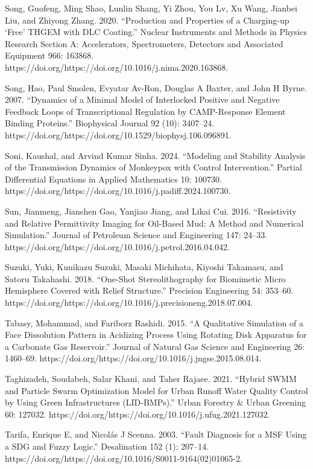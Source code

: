 \documentclass[utf8]{gradu3}
\begin{document}
Song, Guofeng, Ming Shao, Lunlin Shang, Yi Zhou, You Lv, Xu Wang, Jianbei Liu, and Zhiyong Zhang. 2020. “Production and Properties of a Charging-up ‘Free’ THGEM with DLC Coating.” Nuclear Instruments and Methods in Physics Research Section A: Accelerators, Spectrometers, Detectors and Associated Equipment 966: 163868. https://doi.org/https://doi.org/10.1016/j.nima.2020.163868.

Song, Hao, Paul Smolen, Evyatar Av-Ron, Douglas A Baxter, and John H Byrne. 2007. “Dynamics of a Minimal Model of Interlocked Positive and Negative Feedback Loops of Transcriptional Regulation by CAMP-Response Element Binding Proteins.” Biophysical Journal 92 (10): 3407–24. https://doi.org/https://doi.org/10.1529/biophysj.106.096891.

Soni, Kaushal, and Arvind Kumar Sinha. 2024. “Modeling and Stability Analysis of the Transmission Dynamics of Monkeypox with Control Intervention.” Partial Differential Equations in Applied Mathematics 10: 100730. https://doi.org/https://doi.org/10.1016/j.padiff.2024.100730.

Sun, Jianmeng, Jianshen Gao, Yanjiao Jiang, and Likai Cui. 2016. “Resistivity and Relative Permittivity Imaging for Oil-Based Mud: A Method and Numerical Simulation.” Journal of Petroleum Science and Engineering 147: 24–33. https://doi.org/https://doi.org/10.1016/j.petrol.2016.04.042.

Suzuki, Yuki, Kunikazu Suzuki, Masaki Michihata, Kiyoshi Takamasu, and Satoru Takahashi. 2018. “One-Shot Stereolithography for Biomimetic Micro Hemisphere Covered with Relief Structure.” Precision Engineering 54: 353–60. https://doi.org/https://doi.org/10.1016/j.precisioneng.2018.07.004.

Tabasy, Mohammad, and Fariborz Rashidi. 2015. “A Qualitative Simulation of a Face Dissolution Pattern in Acidizing Process Using Rotating Disk Apparatus for a Carbonate Gas Reservoir.” Journal of Natural Gas Science and Engineering 26: 1460–69. https://doi.org/https://doi.org/10.1016/j.jngse.2015.08.014.

Taghizadeh, Soudabeh, Salar Khani, and Taher Rajaee. 2021. “Hybrid SWMM and Particle Swarm Optimization Model for Urban Runoff Water Quality Control by Using Green Infrastructures (LID-BMPs).” Urban Forestry \& Urban Greening 60: 127032. https://doi.org/https://doi.org/10.1016/j.ufug.2021.127032.

Tarifa, Enrique E, and Nicolás J Scenna. 2003. “Fault Diagnosis for a MSF Using a SDG and Fuzzy Logic.” Desalination 152 (1): 207–14. https://doi.org/https://doi.org/10.1016/S0011-9164(02)01065-2.
\end{document}
